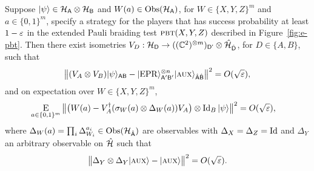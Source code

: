 
  \begin{lemma}
Suppose $|\psi\rangle\in\mathcal{H}_{\textsf{A}}\otimes \mathcal{H}_{\textsf{B}}$ and $W(a) \in \mathrm{Obs}(\mathcal{H}_{\textsf{A}})$, for $W\in \{X,Y,Z\}^m$ and $a\in\{0,1\}^m$, specify a strategy for the players that has success probability at least $1-\varepsilon$ in the extended Pauli braiding test $\textsc{pbt}(X,Y,Z)$ described in Figure~\ref{fig:e-pbt}. 
Then there exist isometries $V_D:\mathcal{H}_{\textsf{D}} \to ((\mathbb{C}^2)^{\otimes m})_{{\textsf{D'}}}  \otimes \hat{\mathcal{H}}_{\hat{{\textsf{D}}}}$, for $D\in\{A,B\}$, such that
$$\big\| (V_A \otimes V_B) |\psi\rangle_{{\textsf{AB}}} - |{\rm EPR}\rangle_{{\textsf{A}}'{\textsf{B}}'}^{\otimes n} |\textsc {aux}\rangle_{\hat{{\textsf{A}}}\hat{{\textsf{B}}}} \big\|^2 = O(\sqrt{\varepsilon}),$$
and on expectation over  $W\in \{X,Y,Z\}^m$,
\begin{align}\label{eq:test-sigmay-2}
 \mathop{\textsc{E}}_{a\in\{0,1\}^m} \big\| \big(W(a) -V_A^\dagger (\sigma_W(a) \otimes \Delta_W(a)) V_A\big) \otimes \mathop{\rm Id}\nolimits_B |\psi\rangle \big\|^2 &= O(\sqrt{\varepsilon}),
\end{align}
where $\Delta_W(a) = \prod_i \Delta_{W_i}^{a_i} \in \mathrm{Obs}({\mathcal{H}}_{\hat{{\textsf{A}}}})$ are observables with $\Delta_{X}=\Delta_{Z}=\mathop{\rm Id}\nolimits$ and $\Delta_{Y}$ an arbitrary observable on $\hat{\mathcal{H}}$ such that
	$$ \big\|\Delta_Y \otimes \Delta_Y |\textsc {aux}\rangle - |\textsc {aux}\rangle \big\|^2 = O(\sqrt{\varepsilon}).$$
\end{lemma}
